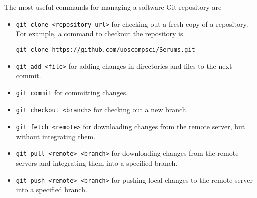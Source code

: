 The most useful commands for managing a software Git repository are
\begin{itemize}
\item 
\lstinline{git clone <repository_url>} for checking out a fresh copy of a repository. For example, a command to
checkout the \Serums{} repository is 

\begin{lstlisting}[basicstyle=\small]
git clone https://github.com/uoscompsci/Serums.git
\end{lstlisting}

\item \lstinline{git add <file>} for adding changes in directories and files to the next commit.

\item \lstinline{git commit} for committing changes.

\item \lstinline{git checkout <branch>} for checking out a new branch.

\item \lstinline{git fetch <remote>} for downloading changes from the remote server, but without integrating them.

\item \lstinline{git pull <remote> <branch>} for downloading changes from the remote servers and integrating them into a specified branch.

\item \lstinline{git push <remote> <branch>} for pushing local changes to the remote server into a specified branch.

\end{itemize}
